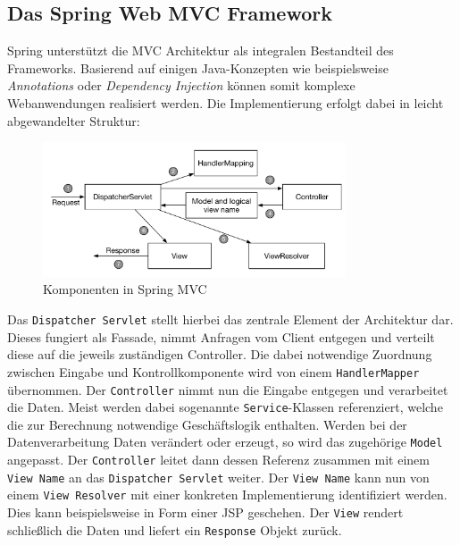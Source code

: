 \subsection{Das Spring Web MVC Framework}
\label{subsec:spring_mvc}
Spring unterstützt die \acs{MVC} Architektur als integralen Bestandteil des Frameworks. Basierend auf einigen Java-Konzepten wie beispielsweise \textit{Annotations} oder \textit{Dependency Injection} können somit komplexe Webanwendungen realisiert werden. Die Implementierung erfolgt dabei in leicht abgewandelter Struktur: \\
\begin{figure}[bth] 
  \centering
  \includegraphics[width=0.8\textwidth]{Graphics/spring_mvc}
  \caption[Komponenten in Spring MVC, Quelle: Walls (2011), S. 132]{Komponenten in Spring MVC \cite{walls:2011}}
\end{figure}
\newpage
Das \texttt{Dispatcher Servlet} stellt hierbei das zentrale Element der Architektur dar. Dieses fungiert als Fassade, nimmt Anfragen vom Client entgegen und verteilt diese auf die jeweils zuständigen Controller. Die dabei notwendige Zuordnung zwischen Eingabe und Kontrollkomponente wird von einem \texttt{HandlerMapper} übernommen. Der \texttt{Controller} nimmt nun die Eingabe entgegen und verarbeitet die Daten. Meist werden dabei sogenannte \texttt{Service}-Klassen referenziert, welche die zur Berechnung notwendige Geschäftslogik enthalten. Werden bei der Datenverarbeitung Daten verändert oder erzeugt, so wird das zugehörige \texttt{Model} angepasst. Der \texttt{Controller} leitet dann dessen Referenz zusammen mit einem \texttt{View Name} an das \texttt{Dispatcher Servlet} weiter. Der \texttt{View Name} kann nun von einem \texttt{View Resolver} mit einer konkreten Implementierung identifiziert werden. Dies kann beispielsweise in Form einer \acs{JSP} geschehen. Der \texttt{View} rendert schließlich die Daten und liefert ein \texttt{Response} Objekt zurück.\\\\

